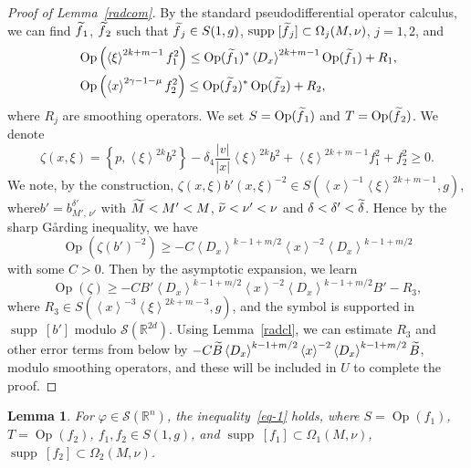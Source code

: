 \documentclass[10pt]{amsart}
\newtheorem{lemm}[cdrthm]{Lemma}
\theoremstyle{definition}
\renewcommand*\c{\gamma}
\renewcommand*\d{\delta}
\newcommand*\f{\varphi}
\newcommand*\m{\mu}
\newcommand*\n{\nu}
\newcommand*\x{\xi}
\newcommand*\z{\zeta}
\renewcommand{\O}{\Omega}
\DeclareMathOperator{\Op}{Op}
\newcommand*\re{\mathbb{R}}
\newcommand{\clS}{\mathcal{S}}
\DeclareMathOperator{\supp}{supp\;}
\newcommand{\jap}[1]{\left\langle #1 \right\rangle}
\let\oldtilde\tilde
\renewcommand*{\tilde}[1]{\mathchoice{\widetilde{#1}}{\widetilde{#1}}{\oldtilde{#1}}{\oldtilde{#1}}}
\begin{document}
\begin{proof}[Proof of Lemma~\ref{radcom}]
By the standard pseudodifferential operator calculus, we can find $\tilde f_1$, $\tilde f_2$ such that $\tilde f_j\in S(1,g)$, $\supp[\tilde f_j]\subset \O_j(M,\n)$, $j=1,2$, and
\begin{align*}
&\Op\left(\jap{\x}^{2k+m-1}f_1^2\right)\leq \Op(\tilde f_1)^*\jap{D_x}^{2k+m-1}\Op(\tilde f_1) +R_1, \\
&\Op\left(\jap{x}^{2\c-1-\m}f_2^2\right)\leq \Op(\tilde f_2)^*\Op(\tilde f_2) +R_2,
\end{align*}
where $R_j$ are smoothing operators. We set $S=\Op(\tilde f_1)$ and $T=\Op(\tilde f_2)$. We denote
\[
\z(x,\x)= \left\{p,\jap{\x}^{2k}b^2\right\} - \d_4 \frac{|v|}{|x|} \jap{\x}^{2k}b^2 +\jap{\x}^{2k+m-1}f_1^2 +f_2^2\geq 0.
\]
We note, by the construction, $\z(x,\x) b'(x,\x)^{-2}\in S(\jap{x}^{-1}\jap{\x}^{2k+m-1},g)$, where\linebreak $b'=b_{M',\,\n'}^{\d'}$ with $\tilde M<M'<M$, $\tilde\n<\n'<\n$ and $\d<\d'<\tilde{\d}$. Hence by the sharp G{\aa}rding inequality, we have
\[
\Op\left(\z(b')^{-2}\right)\geq -C\jap{D_x}^{k-1+m/2}\jap{x}^{-2}\jap{D_x}^{k-1+m/2}
\]
with some $C>0$. Then by the asymptotic expansion, we learn
\[
\Op(\z) \geq -CB' \jap{D_x}^{k-1+m/2}\jap{x}^{-2}\jap{D_x}^{k-1+m/2} B' -R_3,
\]
where $R_3\in S(\jap{x}^{-3}\jap{\x}^{2k+m-3},g)$, and the symbol is supported in $\supp[b']$ modulo $\clS(\re^{2d})$. Using Lemma~\ref{radcl}, we can estimate $R_3$ and other error terms from below by $-C\tilde B \jap{D_x}^{k-1+m/2}\jap{x}^{-2}\jap{D_x}^{k-1+m/2}\tilde B$, modulo smoothing operators, and these will be included in $U$ to complete the proof.
\end{proof}

\begin{lemm}\label{radres}
For $\f\in \clS(\re^n)$, the inequality~\eqref{eq-1} holds, where $S=\Op(f_1)$, $T=\Op(f_2)$, $f_1, f_2\in S(1,g)$, and $\supp[f_1]\subset \O_1(M,\n)$, $\supp[f_2]\subset \O_2(M,\n)$.
\end{lemm}
\end{document}
